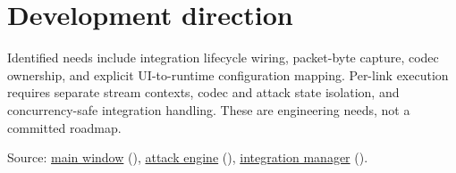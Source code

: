 \section*{Development direction}
\par\noindent\begin{minipage}{\linewidth}\setlength{\parskip}{5pt}
Identified needs include integration lifecycle wiring, packet-byte capture, codec ownership, and explicit UI-to-runtime configuration mapping. Per-link execution requires separate stream contexts, codec and attack state isolation, and concurrency-safe integration handling. These are engineering needs, not a committed roadmap.
{\footnotesize\color{muted}\raggedright Source: \href{https://github.com/neerajjayesh/GridSec-project/blob/main/gui/main_window.py}{main window} (), \href{https://github.com/neerajjayesh/GridSec-project/blob/main/core/attack_engine.py}{attack engine} (), \href{https://github.com/neerajjayesh/GridSec-project/blob/main/core/integration_manager.py}{integration manager} ().\par}
\end{minipage}\par

